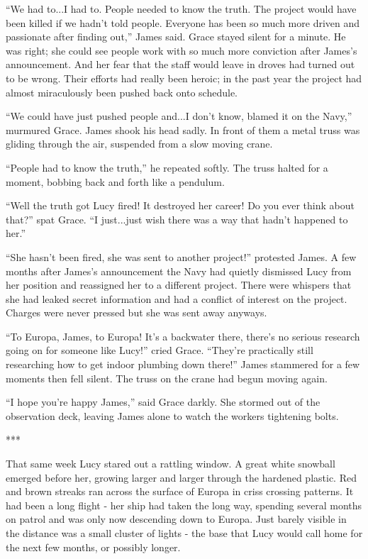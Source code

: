 \documentclass[openany, 12pt]{book} %
\begin{document}
``We had to...I had to. People needed to know the truth. The project would have been killed if we hadn't told people. Everyone has been so much more driven and passionate after finding out,'' James said. Grace stayed silent for a minute. He was right; she could see people work with so much more conviction after James's announcement. And her fear that the staff would leave in droves had turned out to be wrong. Their efforts had really been heroic; in the past year the project had almost miraculously been pushed back onto schedule.

``We could have just pushed people and...I don't know, blamed it on the Navy,'' murmured Grace. James shook his head sadly. In front of them a metal truss was gliding through the air, suspended from a slow moving crane.

``People had to know the truth,'' he repeated softly. The truss halted for a moment, bobbing back and forth like a pendulum.

``Well the truth got Lucy fired! It destroyed her career! Do you ever think about that?'' spat Grace. ``I just...just wish there was a way that hadn't happened to her.''

``She hasn't been fired, she was sent to another project!'' protested James. A few months after James's announcement the Navy had quietly dismissed Lucy from her position and reassigned her to a different project. There were whispers that she had leaked secret information and had a conflict of interest on the project. Charges were never pressed but she was sent away anyways.

``To Europa, James, to Europa! It's a backwater there, there's no serious research going on for someone like Lucy!'' cried Grace. ``They're practically still researching how to get indoor plumbing down there!'' James stammered for a few moments then fell silent. The truss on the crane had begun moving again.

``I hope you're happy James,'' said Grace darkly. She stormed out of the observation deck, leaving James alone to watch the workers tightening bolts.

\begin{center}
***
\end{center}

That same week Lucy stared out a rattling window. A great white snowball emerged before her, growing larger and larger through the hardened plastic. Red and brown streaks ran across the surface of Europa in criss crossing patterns. It had been a long flight - her ship had taken the long way, spending several months on patrol and was only now descending down to Europa. Just barely visible in the distance was a small cluster of lights - the base that Lucy would call home for the next few months, or possibly longer.
\end{document}
